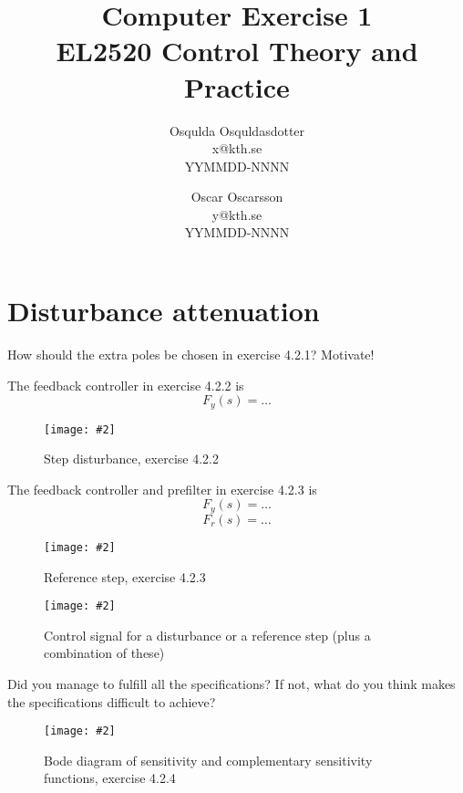 \documentclass[a4paper,11pt]{article}
\title{
	Computer Exercise 1\\
	EL2520 Control Theory and Practice
}
\author{
	Osqulda Osquldasdotter\\
	x@kth.se\\
	YYMMDD-NNNN
	\and
	Oscar Oscarsson\\
	y@kth.se\\
	YYMMDD-NNNN
}
\newcommand{\image}[3][width=1.0\columnwidth]{
	\begin{figure}[h!]
		\centering
	    \texttt{[image: \#2]}
		\caption{#3}
		\label{fig:#2}
	\end{figure}
}
\begin{document}
	\maketitle

	\section*{Disturbance attenuation}
	
	How should the extra poles be chosen in exercise 4.2.1? Motivate! 
	\par\dotfill\par\dotfill\par

	The feedback controller in exercise 4.2.2 is
	\[
		F_y(s) = \ldots
	\]

	\image{figure_1.pdf}{Step disturbance, exercise 4.2.2}
	
	The feedback controller and prefilter in exercise 4.2.3 is 
	\[
	F_y(s) = \ldots
	\]
	\[
	F_r(s) = \ldots
	\]
	\image{figure_2.pdf}{Reference step, exercise 4.2.3}
	\image{figure_3.pdf}{Control signal for a disturbance or a reference step (plus a combination of these)}

	Did you manage to fulfill all the specifications? If not, what do you think makes the specifications difficult to achieve?
	\par\dotfill\par\dotfill\par
	
	\image{figure_4.pdf}{Bode diagram of sensitivity and complementary sensitivity functions, exercise 4.2.4}
\end{document}
